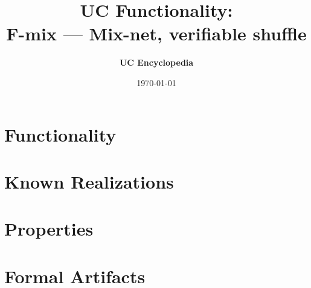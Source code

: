\documentclass[11pt,a4paper]{article}
\title{\textbf{\Large UC Functionality:}\\[0.2em] \Large F-mix --- Mix-net, verifiable shuffle}
\author{\textbf{UC Encyclopedia}}
\date{\today}
\newtheorem{functionality}{Functionality}
\begin{document}
\maketitle

\begin{abstract}
\end{abstract}

\section{Functionality}

%

\section{Known Realizations}


\section{Properties}


\section{Formal Artifacts}

\end{document}
